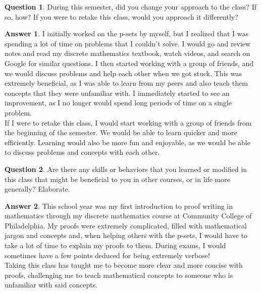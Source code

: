 \documentclass[article, 12pt]{article}
\theoremstyle{definition}
\newtheorem{question}{Question}
\newtheorem{answer}{Answer}
\begin{document}
    \begin{question}
        During this semester, did you change your approach to the class? If so, how? If you were to retake this class, would you approach it differently?
    \end{question}
    \begin{answer}
        I initially worked on the p-sets by myself, but I realized that I was spending a lot of time on problems that I couldn't solve. I would go and review notes and read my discrete mathematics textbook, watch videos, and search on Google for similar questions. I then started working with a group of friends, and we would discuss problems and help each other when we got stuck. This was extremely beneficial, as I was able to learn from my peers and also teach them concepts that they were unfamiliar with. I immediately started to see an improvement, as I no longer would spend long periods of time on a single problem.
        \\[12pt]
        If I were to retake this class, I would start working with a group of friends from the beginning of the semester. We would be able to learn quicker and more efficiently. Learning would also be more fun and enjoyable, as we would be able to discuss problems and concepts with each other.
    \end{answer}

    \begin{question}
        Are there any skills or behaviors that you learned or modified in this class that might be
        beneficial to you in other courses, or in life more generally? Elaborate.
    \end{question}
    \begin{answer}
        This school year was my first introduction to proof writing in mathematics through my discrete mathematics course at Community College of Philadelphia. My proofs were extremely complicated, filled with mathematical jargon and concepts and, when helping others with the p-sets, I would have to take a lot of time to explain my proofs to them. During exams, I would sometimes have a few points deduced for being extremely verbose!
        \\[12pt]
        Taking this class has taught me to become more clear and more concise with proofs, challenging me to teach mathematical concepts to someone who is unfamiliar with said concepts. 
    \end{answer}
\end{document}
